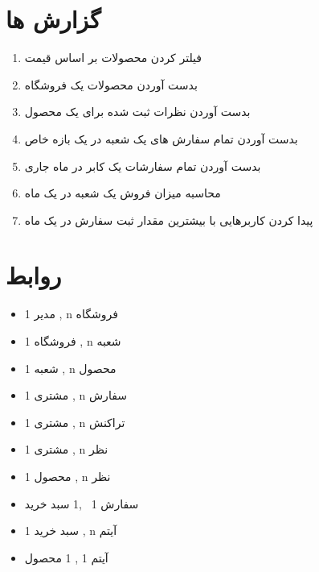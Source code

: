 \documentclass[]{article}
\begin{document}
\section{گزارش ها}
\begin{enumerate}
\item فیلتر کردن محصولات بر اساس قیمت
\item بدست آوردن محصولات یک فروشگاه
\item بدست آوردن نظرات ثبت شده برای یک محصول 
\item بدست آوردن تمام سفارش های یک شعبه در یک بازه خاص
\item بدست آوردن تمام سفارشات یک کابر در ماه جاری
\item محاسبه میزان فروش یک شعبه در یک ماه
\item پیدا کردن کاربرهایی با بیشترین مقدار ثبت سفارش در یک ماه
\end{enumerate}
\section{روابط}
\begin{itemize}


\item مدیر 1 , n فروشگاه 
\item فروشگاه 1  , n شعبه 
\item شعبه 1 , n محصول
\item مشتری 1 , n سفارش
\item مشتری 1  , n تراکنش 
\item 1 مشتری , n نظر
\item محصول 1 , n نظر 
\item سفارش 1  ,1 سبد خرید 
\item سبد خرید 1 , n آیتم 
\item آیتم 1 , 1 محصول

\end{itemize}
\end{document}
